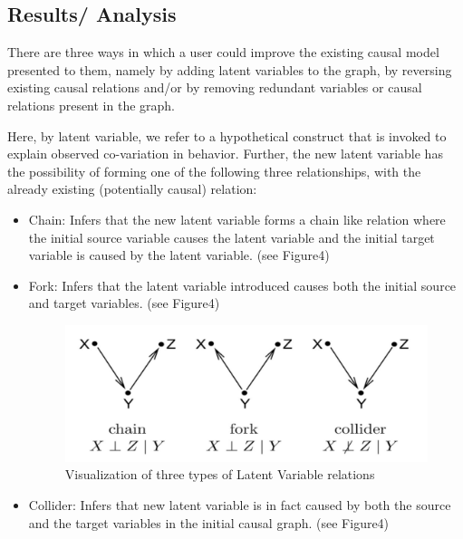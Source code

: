 \documentclass{vgtc}                          %
\begin{document}
\subsection{Results/ Analysis}

There are three ways in which a user could improve the existing causal model presented to them, namely by adding latent variables to the graph, by reversing existing causal relations and/or by removing redundant variables or causal relations present in the graph.

Here, by latent variable, we refer to a hypothetical construct that is invoked to explain observed co-variation in behavior. Further, the new latent variable has the possibility of forming one of the following three relationships, with the already existing (potentially causal) relation:
\begin{itemize}
    \item Chain: Infers that the new latent variable forms a chain like relation where the initial source variable causes the latent variable and the initial target variable is caused by the latent variable. (see Figure4)
    \item Fork: Infers that the latent variable introduced causes both the initial source and target variables. (see Figure4)
    \begin{figure}[tb]
     \centering %
     \includegraphics[width=\columnwidth]{CFC}
     \caption{Visualization of three types of Latent Variable relations}
     
     \label{fig:sample}
    \end{figure}
    \item Collider: Infers that new latent variable is in fact caused by both the source and the target variables in the initial causal graph. (see Figure4)
\end{itemize}
\end{document}
